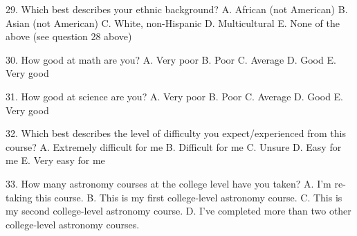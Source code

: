29. Which best describes your ethnic background?
A. African (not American)
B. Asian (not American)
C. White, non-Hispanic
D. Multicultural
E. None of the above (see question 28 above)


30. How good at math are you?
A. Very poor
B. Poor
C. Average
D. Good
E. Very good

31. How good at science are you?
A. Very poor
B. Poor
C. Average
D. Good
E. Very good

32. Which best describes the level of difficulty you expect/experienced from this course?
A. Extremely difficult for me
B. Difficult for me
C. Unsure
D. Easy for me
E. Very easy for me

33. How many astronomy courses at the college level have you taken?
A. I'm re-taking this course.
B. This is my first college-level astronomy course.
C. This is my second college-level astronomy course.
D. I've completed more than two other college-level astronomy courses.


\endinput


